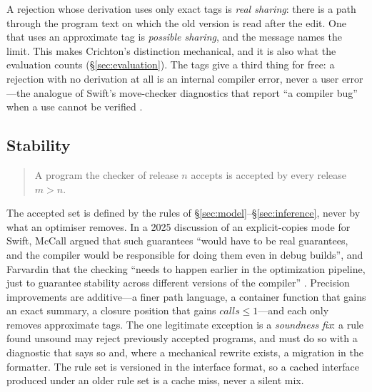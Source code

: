 A rejection whose derivation uses only exact tags is \emph{real sharing}: there is a path through the
program text on which the old version is read after the edit. One that uses an approximate tag is
\emph{possible sharing}, and the message names the limit. This makes Crichton's distinction mechanical,
and it is also what the evaluation counts (\S\ref{sec:evaluation}). The tags give a third thing for free:
a rejection with no derivation at all is an internal compiler error, never a user error---the analogue
of Swift's move-checker diagnostics that report ``a compiler bug'' when a use cannot be verified
\citep{swift2026diagnosticssil}.

\subsection{Stability}
\label{sec:errors-stability}

\begin{quote}
A program the checker of release $n$ accepts is accepted by every release $m > n$.
\end{quote}

The accepted set is defined by the rules of \S\ref{sec:model}--\S\ref{sec:inference}, never by what an
optimiser removes. In a 2025 discussion of an explicit-copies mode for Swift, McCall argued that such
guarantees ``would have to be real guarantees, and the compiler would be responsible for doing them even
in debug builds'', and Farvardin that the checking ``needs to happen earlier in the optimization
pipeline, just to guarantee stability across different versions of the compiler''
\citep{swift2025explicitcopies}. Precision improvements are additive---a finer path language, a
container function that gains an exact summary, a closure position that gains $\mathit{calls} \le
1$---and each only removes approximate tags. The one legitimate exception is a \emph{soundness fix}: a
rule found unsound may reject previously accepted programs, and must do so with a diagnostic that says
so and, where a mechanical rewrite exists, a migration in the formatter. The rule set is versioned in
the interface format, so a cached interface produced under an older rule set is a cache miss, never a
silent mix.
